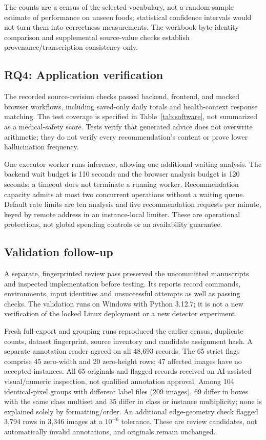 \documentclass[12pt,journal,draftclsnofoot,onecolumn]{IEEEtran}
\begin{document}
The counts are a census of the selected vocabulary, not a random-sample estimate of performance on unseen foods; statistical confidence intervals would not turn them into correctness measurements. The workbook byte-identity comparison and supplemental source-value checks establish provenance/transcription consistency only.

\subsection{RQ4: Application verification}
The recorded source-revision checks passed backend, frontend, and mocked browser workflows, including saved-only daily totals and health-context response matching. The test coverage is specified in Table~\ref{tab:software}, not summarized as a medical-safety score. Tests verify that generated advice does not overwrite arithmetic; they do not verify every recommendation's content or prove lower hallucination frequency.

One executor worker runs inference, allowing one additional waiting analysis. The backend wait budget is 110 seconds and the browser analysis budget is 120 seconds; a timeout does not terminate a running worker. Recommendation capacity admits at most two concurrent operations without a waiting queue. Default rate limits are ten analysis and five recommendation requests per minute, keyed by remote address in an instance-local limiter. These are operational protections, not global spending controls or an availability guarantee.

\subsection{Validation follow-up}
A separate, fingerprinted review pass preserved the uncommitted manuscripts and inspected implementation before testing. Its reports record commands, environments, input identities and unsuccessful attempts as well as passing checks. The validation runs on Windows with Python 3.12.7; it is not a new verification of the locked Linux deployment or a new detector experiment.

Fresh full-export and grouping runs reproduced the earlier census, duplicate counts, dataset fingerprint, source inventory and candidate assignment hash. A separate annotation reader agreed on all 48,693 records. The 65 strict flags comprise 45 zero-width and 20 zero-height rows; 47 affected images have no accepted instances. All 65 originals and flagged records received an AI-assisted visual/numeric inspection, not qualified annotation approval. Among 104 identical-pixel groups with different label files (209 images), 69 differ in boxes with the same class multiset and 35 differ in class or instance multiplicity; none is explained solely by formatting/order. An additional edge-geometry check flagged 3,794 rows in 3,346 images at a $10^{-6}$ tolerance. These are review candidates, not automatically invalid annotations, and originals remain unchanged.
\end{document}
